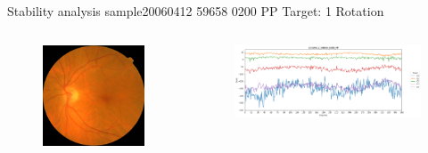 \documentclass{beamer}
\begin{document}
\begin{frame}{Stability analysis sample}{20060412 59658 0200 PP Target: 1 Rotation}
\begin{columns}
	\begin{column}{0.3\textwidth}
		\begin{figure}[p]
			\centering
			\includegraphics[width=\textwidth]{chapter_stability/20060412_59658_0200_PP/20060412_59658_0200_PP.jpeg}
		\end{figure}	
	\end{column}
	\begin{column}{0.45\textwidth}  %
		\begin{figure}[p]
			\centering
			\includegraphics[width=\textwidth]{chapter_stability/20060412_59658_0200_PP/r/scores.png}
		\end{figure}
		\centering
		\href{run:videos_stability/Messidor_20060412_59658_0200_PP_Target_1_Checking_Rotation_Sensitivity.mp4}{\color{blue}{Rotation Visualization}} 
	\end{column}
\end{columns}
\end{frame}
\end{document}
